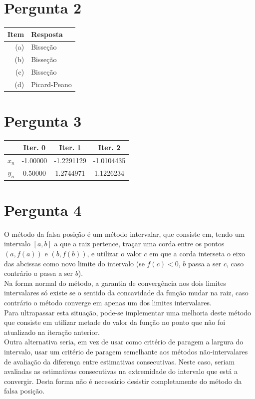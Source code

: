 {\section{Pergunta 2}
\begin{center} \begin{tabular}{r | l}
	\textbf{Item} & \textbf{Resposta} \\ \hline
	(a) & Bisseção \\
	(b) & Bisseção \\
	(c) & Bisseção \\
	(d) & Picard-Peano
\end{tabular} \end{center}
\section{Pergunta 3}

\begin{center} \begin{tabular}{c | c c c}
	& Iter. 0 & Iter. 1 & Iter. 2\\ \hline
	$x_n$ & -1.00000 & -1.2291129 & -1.0104435 \\
	$y_n$ & 0.50000 & 1.2744971 & 1.1226234
\end{tabular} \end{center}
\section{Pergunta 4}
O método da falsa posição é um método intervalar, que consiste em, tendo um intervalo $[a,b]$ a que a raiz pertence, traçar uma corda entre os pontos $(a, f(a))$ e $(b, f(b))$, e utilizar o valor $c$ em que a corda interseta o eixo das abcissas como novo limite do intervalo (se $f(c) < 0$, $b$ passa a ser $c$, caso contrário $a$ passa a ser $b$).\\
Na forma normal do método, a garantia de convergência nos dois limites intervalares só existe se o sentido da concavidade da função mudar na raiz, caso contrário o método converge em apenas um dos limites intervalares.\\
Para ultrapassar esta situação, pode-se implementar uma melhoria deste método que consiste em utilizar metade do valor da função no ponto que não foi atualizado na iteração anterior.\\
Outra alternativa seria, em vez de usar como critério de paragem a largura do intervalo, usar um critério de paragem semelhante aos métodos não-intervalares de avaliação da diferença entre estimativas consecutivas. Neste caso, seriam avaliadas as estimativas consecutivas na extremidade do intervalo que está a convergir. Desta forma não é necessário desistir completamente do método da falsa posição.
}